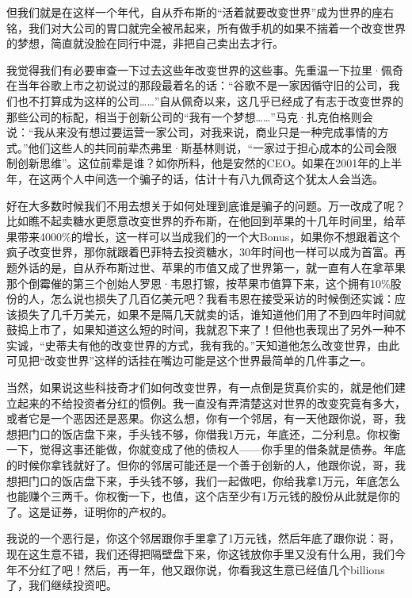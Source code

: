 但我们就是在这样一个年代，自从乔布斯的``活着就要改变世界''成为世界的座右铭，我们对大公司的胃口就完全被吊起来，所有做手机的如果不揣着一个改变世界的梦想，简直就没脸在同行中混，非把自己卖出去才行。

我觉得我们有必要审查一下过去这些年改变世界的这些事。先重温一下拉里·佩奇在当年谷歌上市之初说过的那段最着名的话：``谷歌不是一家因循守旧的公司，我们也不打算成为这样的公司\ldots\ldots{}''自从佩奇以来，这几乎已经成了有志于改变世界的那些公司的标配，相当于创新公司的``我有一个梦想\ldots\ldots''马克·扎克伯格则会说：``我从来没有想过要运营一家公司，对我来说，商业只是一种完成事情的方式。''他们这些人的共同前辈杰弗里·斯基林则说，``一家过于担心成本的公司会限制创新思维''。这位前辈是谁？如你所料，他是安然的CEO。如果在2001年的上半年，在这两个人中间选一个骗子的话，估计十有八九佩奇这个犹太人会当选。

好在大多数时候我们不用去想关于如何处理到底谁是骗子的问题。万一改成了呢？比如瞧不起卖糖水更愿意改变世界的乔布斯，在他回到苹果的十几年时间里，给苹果带来4000\%的增长，这一样可以当成我们的一个大Bonus，如果你不想跟着这个疯子改变世界，那你就跟着巴菲特去投资糖水，30年时间也一样可以成为首富。再题外话的是，自从乔布斯过世、苹果的市值又成了世界第一，就一直有人在拿苹果那个倒霉催的第三个创始人罗恩·韦恩打镲，按苹果市值算下来，这个拥有10\%股份的人，怎么说也损失了几百亿美元吧？我看韦恩在接受采访的时候倒还实诚：应该损失了几千万美元，如果不是隔几天就卖的话，谁知道他们用了不到四年时间就鼓捣上市了，如果知道这么短的时间，我就忍下来了！但他也表现出了另外一种不实诚，``史蒂夫有他的改变世界的方式，我有我的。''天知道他怎么改变世界，由此可见把``改变世界''这样的话挂在嘴边可能是这个世界最简单的几件事之一。

当然，如果说这些科技奇才们如何改变世界，有一点倒是货真价实的，就是他们建立起来的不给投资者分红的惯例。我一直没有弄清楚这对世界的改变究竟有多大，或者它是一个恶因还是恶果。你这么想，你有一个邻居，有一天他跟你说，哥，我想把门口的饭店盘下来，手头钱不够，你借我1万元，年底还，二分利息。你权衡一下，觉得这事还能做，你就变成了他的债权人------你手里的借条就是债券。年底的时候你拿钱就好了。但你的邻居可能还是一个善于创新的人，他跟你说，哥，我想把门口的饭店盘下来，手头钱不够，我们一起做吧，你给我拿1万元，年底怎么也能赚个三两千。你权衡一下，也值，这个店至少有1万元钱的股份从此就是你的了。这是证券，证明你的产权的。

我说的一个恶行是，你这个邻居跟你手里拿了1万元钱，然后年底了跟你说：哥，现在这生意不错，我们还得把隔壁盘下来，你这钱放你手里又没有什么用，我们今年不分红了吧！然后，再一年，他又跟你说，你看我这生意已经值几个billions了，我们继续投资吧。

